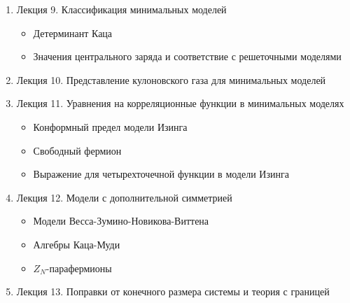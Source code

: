\documentclass[a4paper,12pt]{article}
\theoremstyle{definition}
\theoremstyle{definition}
\theoremstyle{definition}
\begin{document}
\begin{enumerate}
\item Лекция 9. Классификация минимальных моделей
  \begin{itemize}
  \item Детерминант Каца
  \item Значения центрального заряда и соответствие с решеточными моделями
  \end{itemize}
\item Лекция 10. Представление кулоновского газа для минимальных моделей
\item Лекция 11. Уравнения на корреляционные функции в минимальных моделях
  \begin{itemize}
  \item Конформный предел модели Изинга
  \item Свободный фермион
  \item Выражение для четырехточечной функции в модели Изинга
  \end{itemize}
\item Лекция 12. Модели с дополнительной симметрией
  \begin{itemize}
  \item Модели Весса-Зумино-Новикова-Виттена
  \item Алгебры Каца-Муди
  \item $Z_{N}$-парафермионы
  \end{itemize}
\item Лекция 13. Поправки от конечного размера системы и теория с границей
\end{enumerate}
\end{document}
